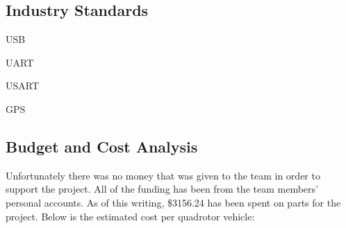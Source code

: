 \documentclass{article}
\numberwithin{equation}{section} %
\begin{document}
\subsection{Industry Standards}
\begin{list}{*}{}
	\item USB
	\item UART
	\item USART
	\item GPS
\end{list}

\subsection{Budget and Cost Analysis}
Unfortunately there was no money that was given to the team in order to support the project. All of the funding has been from the team members' personal accounts. As of this writing, \$3156.24 has been spent on parts for the project. Below is the estimated cost per quadrotor vehicle:
\newpage
\end{document}
